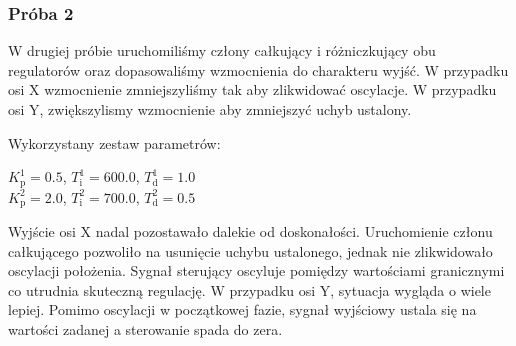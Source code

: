 \subsubsection{Próba 2}
W drugiej próbie uruchomiliśmy człony całkujący i różniczkujący obu regulatorów oraz dopasowaliśmy wzmocnienia 
do charakteru wyjść. W przypadku osi X wzmocnienie zmniejszyliśmy tak aby zlikwidować oscylacje. W przypadku osi Y, 
zwiększylismy wzmocnienie aby zmniejszyć uchyb ustalony.

Wykorzystany zestaw parametrów:

\begin{center}
    $K^{\num{1}}_{\mathrm{p}} = \num{0.5}$, $T^{\num{1}}_{\mathrm{i}} = \num{600.0}$, $T^{\num{1}}_{\mathrm{d}} = \num{1.0}$ \\
    $K^{\num{2}}_{\mathrm{p}} = \num{2.0}$, $T^{\num{2}}_{\mathrm{i}} = \num{700.0}$, $T^{\num{2}}_{\mathrm{d}} = \num{0.5}$ \\
\end{center}
\vspace{1cm}

Wyjście osi X nadal pozostawało dalekie od doskonałości. Uruchomienie członu całkującego pozwoliło na 
usunięcie uchybu ustalonego, jednak nie zlikwidowało oscylacji położenia. Sygnał sterujący
oscyluje pomiędzy wartościami granicznymi co utrudnia skuteczną regulację. W przypadku osi Y, sytuacja
wygląda o wiele lepiej. Pomimo oscylacji w początkowej fazie, sygnał wyjściowy ustala się na wartości zadanej
a sterowanie spada do zera.


